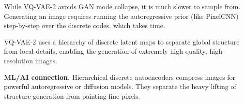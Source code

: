 \documentclass[a4paper,11pt]{article}
\begin{document}
\begin{watchout}
While VQ-VAE-2 avoids GAN mode collapse, it is much slower to sample from. Generating an image requires running the autoregressive prior (like PixelCNN) step-by-step over the discrete codes, which takes time.
\end{watchout}

\begin{keytake}
VQ-VAE-2 uses a hierarchy of discrete latent maps to separate global structure from local details, enabling the generation of extremely high-quality, high-resolution images.
\end{keytake}

\noindent\textbf{ML/AI connection.}
Hierarchical discrete autoencoders compress images for powerful autoregressive or diffusion models. They separate the heavy lifting of structure generation from painting fine pixels.
\end{document}
